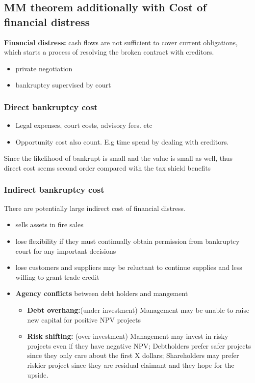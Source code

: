\documentclass{article}
\theoremstyle{definition}
\theoremstyle{thrm}
\theoremstyle{lma}
\theoremstyle{ppst}
\theoremstyle{crlr}
\begin{document}
\subsection{MM theorem additionally with Cost of financial distress}
\textbf{Financial distress: } cash flows are not sufficient to cover current obligations, which starts a process of resolving the broken contract with creditors. 
\begin{itemize}
	\item private negotiation
	\item bankruptcy supervised by court
\end{itemize}

\subsubsection{Direct bankruptcy cost}
\begin{itemize}
	\item Legal expenses, court costs, advisory fees. etc
	\item Opportunity cost also count. E.g time spend by dealing with creditors. 
\end{itemize}
Since the likelihood of bankrupt is small and the value is small as well, thus direct cost seems second order compared with the tax shield benefits

\subsubsection{Indirect bankruptcy cost}
There are potentially large indirect cost of financial distress.
\begin{itemize}
	\item sells assets in fire sales
	\item lose flexibility if they must continually obtain permission from bankruptcy court for any important decisions
	\item lose customers and suppliers may be reluctant to continue supplies and less willing to grant trade credit
	\item \textbf{Agency conflicts} between debt holders and mangement
	\begin{itemize}
		\item \textbf{Debt overhang:}(under investment) Management may be unable to raise new capital for positive NPV projects
		\item \textbf{Risk shifting:} (over investment) Management may invest in risky projects even if they have negative NPV; Debtholders prefer safer projects since they only care about the first X dollars; Shareholders may prefer riskier project since they are residual claimant and they hope for the upside. 
	\end{itemize}
\end{itemize} 
\end{document}
